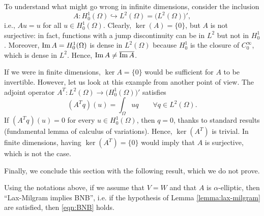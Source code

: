 \begin{example}
	To understand what might go wrong in infinite dimensions, consider the inclusion
	\[
	A: H_0^1(\Omega) \hookrightarrow L^2(\Omega) = \bigl(L^2(\Omega)\bigr)',
	\]
	i.e., $Au = u$ for all $u\in H_0^1(\Omega)$. Clearly, $\ker(A)=\{0\}$, but $A$ is not surjective: in fact, functions with a jump discontinuity can be in $L^2$ but not in $H^1_0$. Moreover, $\operatorname{Im} A = H_0^1(\Omega)$ is dense in $L^2(\Omega)$ because $H_0^1$ is the closure of $C_0^\infty$, which is dense in $L^2$. Hence, $\operatorname{Im} A\neq\overline{\operatorname{Im} A}$.
	
	If we were in finite dimensions, $\ker A = \{0\}$ would be sufficient for $A$ to be invertible. However, let us look at this example from another point of view. The adjoint operator $A^T: L^2(\Omega) \to \bigl(H_0^1(\Omega)\bigr)'$ satisfies
	\[
	(A^T q)(u) = \int_{\Omega} uq \qquad \forall q \in L^2(\Omega).
	\]
	If $(A^T q)(u) = 0$ for every $u \in H_0^1(\Omega)$, then $q = 0$, thanks to standard results (fundamental lemma of calculus of variations). Hence, $\ker (A^T)$ is trivial. In finite dimensions, having $\ker (A^T) = \{0\}$ would imply that $A$ is surjective, which is not the case.
\end{example}

Finally, we conclude this section with the following result, which we do not prove.
\begin{theorem}
    Using the notations above, if we assume that $V=W$ and that $A$ is $\alpha$-elliptic, then ``Lax-Milgram implies BNB'', i.e. if the hypothesis of Lemma \ref{lemma:lax-milgram} are satisfied, then \eqref{eqn:BNB} holds.
\end{theorem}


